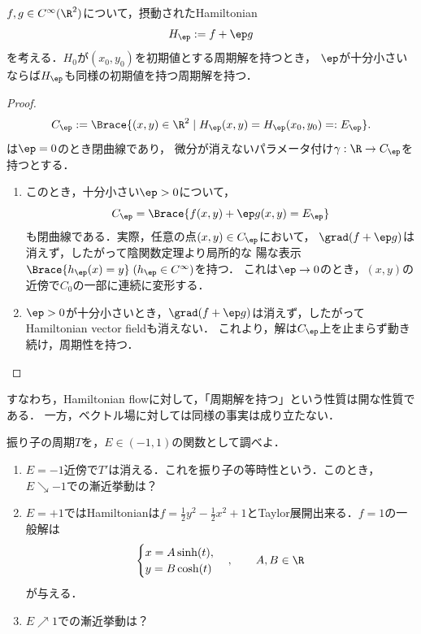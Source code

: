 \documentclass[uplatex,dvipdfmx]{jsarticle}
\begin{document}
\begin{exercise}[Hamilton系の周期解は摂動に対して安定]
    $f,g\in C^\infty(\R^2)$について，摂動されたHamiltonian
    \[H_\ep:=f+\ep g\]
    を考える．$H_0$が$(x_0,y_0)$を初期値とする周期解を持つとき，
    $\ep$が十分小さいならば$H_\ep$も同様の初期値を持つ周期解を持つ．
\end{exercise}
\begin{proof}
    \[C_\ep:=\Brace{(x,y)\in\R^2\mid H_\ep(x,y)=H_\ep(x_0,y_0)=:E_\ep}.\]
    は$\ep=0$のとき閉曲線であり，
    微分が消えないパラメータ付け$\gamma:\R\to C_\ep$を持つとする．
    \begin{enumerate}[{Step}1]
        \item このとき，十分小さい$\ep>0$について，
        \[C_\ep=\Brace{f(x,y)+\ep g(x,y)=E_\ep}\]
        も閉曲線である．実際，任意の点$(x,y)\in C_\ep$において，
        $\grad(f+\ep g)$は消えず，したがって陰関数定理より局所的な
        陽な表示$\Brace{h_\ep(x)=y}\;(h_\ep\in C^\infty)$を持つ．
        これは$\ep\to0$のとき，$(x,y)$の近傍で$C_0$の一部に連続に変形する．
        \item $\ep>0$が十分小さいとき，$\grad(f+\ep g)$は消えず，したがってHamiltonian vector fieldも消えない．
        これより，解は$C_\ep$上を止まらず動き続け，周期性を持つ．
    \end{enumerate}
\end{proof}
\begin{remark*}
    すなわち，Hamiltonian flowに対して，「周期解を持つ」という性質は開な性質である．
    一方，ベクトル場に対しては同様の事実は成り立たない．
\end{remark*}

\begin{exercise}[振り子の周期の挙動]
    振り子の周期$T$を，$E\in(-1,1)$の関数として調べよ．
    \begin{enumerate}
        \item $E=-1$近傍で$T'$は消える．これを振り子の等時性という．このとき，$E\searrow-1$での漸近挙動は？
        \item $E=+1$ではHamiltonianは$f=\frac{1}{2}y^2-\frac{1}{2}x^2+1$とTaylor展開出来る．$f=1$の一般解は
        \[\begin{cases}
            x=A\sinh(t),\\
            y=B\cosh(t)
        \end{cases},\qquad A,B\in\R\]
        が与える．
        \item $E\nearrow1$での漸近挙動は？
    \end{enumerate}
\end{exercise}
\end{document}
